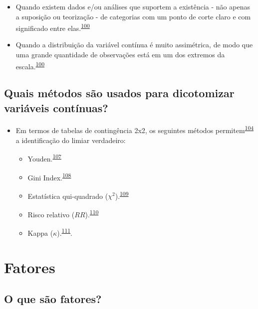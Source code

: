 \documentclass[
  a4paper,
]{book}
\begin{document}
\begin{itemize}
\item
  Quando existem dados e/ou análises que suportem a existência - não apenas a suposição ou teorização - de categorias com um ponto de corte claro e com significado entre elas.\textsuperscript{\protect\hyperlink{ref-MacCallum2002}{100}}
\item
  Quando a distribuição da variável contínua é muito assimétrica, de modo que uma grande quantidade de observações está em um dos extremos da escala.\textsuperscript{\protect\hyperlink{ref-MacCallum2002}{100}}
\end{itemize}

\hypertarget{quais-muxe9todos-suxe3o-usados-para-dicotomizar-variuxe1veis-contuxednuas}{%
\subsection{Quais métodos são usados para dicotomizar variáveis contínuas?}\label{quais-muxe9todos-suxe3o-usados-para-dicotomizar-variuxe1veis-contuxednuas}}

\begin{itemize}
\item
  Em termos de tabelas de contingência 2x2, os seguintes métodos permitem\textsuperscript{\protect\hyperlink{ref-Prince2017}{104}} a identificação do limiar verdadeiro:

  \begin{itemize}
  \item
    Youden.\textsuperscript{\protect\hyperlink{ref-YOUDEN1950}{107}}
  \item
    Gini Index.\textsuperscript{\protect\hyperlink{ref-strobl2007}{108}}
  \item
    Estatística qui-quadrado (\(\chi^2\)).\textsuperscript{\protect\hyperlink{ref-pearson1900}{109}}
  \item
    Risco relativo (\(RR\)).\textsuperscript{\protect\hyperlink{ref-Greiner2000}{110}}
  \item
    Kappa (\(\kappa\)).\textsuperscript{\protect\hyperlink{ref-fleiss1971}{111}}.
  \end{itemize}
\end{itemize}

\hypertarget{fatores}{%
\section{Fatores}\label{fatores}}

\hypertarget{o-que-suxe3o-fatores}{%
\subsection{O que são fatores?}\label{o-que-suxe3o-fatores}}
\end{document}
